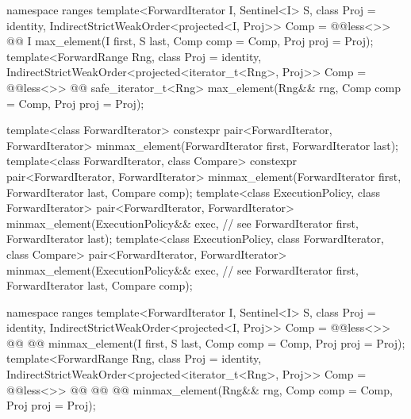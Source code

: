 \begin{addedblock}
\begin{codeblock}
  namespace ranges {
    template<ForwardIterator I, Sentinel<I> S, class Proj = identity,
        IndirectStrictWeakOrder<projected<I, Proj>> Comp = @@less<>>
      @@ I max_element(I first, S last, Comp comp = Comp{}, Proj proj = Proj{});
    template<ForwardRange Rng, class Proj = identity,
        IndirectStrictWeakOrder<projected<iterator_t<Rng>, Proj>> Comp = @@less<>>
      @@ safe_iterator_t<Rng>
        max_element(Rng&& rng, Comp comp = Comp{}, Proj proj = Proj{});
  }
\end{codeblock}\end{addedblock}\begin{codeblock}
  template<class ForwardIterator>
    constexpr pair<ForwardIterator, ForwardIterator>
      minmax_element(ForwardIterator first, ForwardIterator last);
  template<class ForwardIterator, class Compare>
    constexpr pair<ForwardIterator, ForwardIterator>
      minmax_element(ForwardIterator first, ForwardIterator last, Compare comp);
  template<class ExecutionPolicy, class ForwardIterator>
    pair<ForwardIterator, ForwardIterator>
      minmax_element(ExecutionPolicy&& exec, // see 
                     ForwardIterator first, ForwardIterator last);
  template<class ExecutionPolicy, class ForwardIterator, class Compare>
    pair<ForwardIterator, ForwardIterator>
      minmax_element(ExecutionPolicy&& exec, // see 
                     ForwardIterator first, ForwardIterator last, Compare comp);
\end{codeblock}\begin{addedblock}\begin{codeblock}
  namespace ranges {
    template<ForwardIterator I, Sentinel<I> S, class Proj = identity,
        IndirectStrictWeakOrder<projected<I, Proj>> Comp = @@less<>>
      @@
      @@
        minmax_element(I first, S last, Comp comp = Comp{}, Proj proj = Proj{});
    template<ForwardRange Rng, class Proj = identity,
        IndirectStrictWeakOrder<projected<iterator_t<Rng>, Proj>> Comp = @@less<>>
      @@
                  @@
      @@
        minmax_element(Rng&& rng, Comp comp = Comp{}, Proj proj = Proj{});
  }
\end{codeblock}\end{addedblock}\begin{codeblock}


\end{codeblock}
